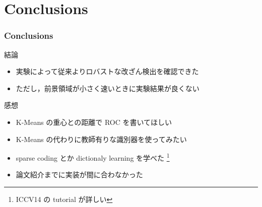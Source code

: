 \section{Conclusions}


\begin{frame}\frametitle{Conclusions}
\begin{block}{結論}
\begin{itemize}
    \item 実験によって従来よりロバストな改ざん検出を確認できた
    \item ただし，前景領域が小さく速いときに実験結果が良くない
\end{itemize} 
\end{block}

\begin{block}{感想}
\begin{itemize}
  \item K-Means の重心との距離で ROC を書いてほしい
  \item K-Means の代わりに教師有りな識別器を使ってみたい
  \item sparse coding とか dictionaly learning を学べた \footnote{ICCV14 の tutorial\cite{Mairal2014} が詳しい}
  \item 論文紹介までに実装が間に合わなかった
\end{itemize}
\end{block}
\end{frame}